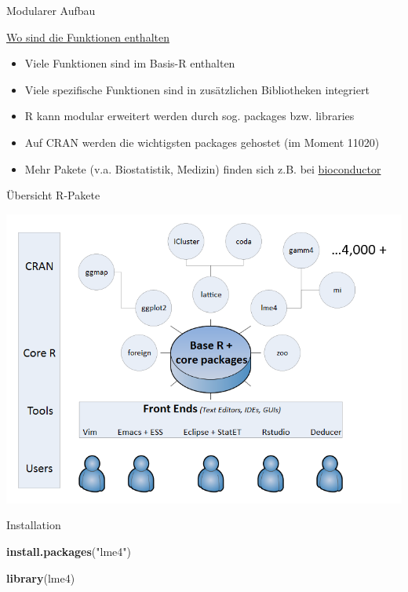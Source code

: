 \documentclass[ignorenonframetext,]{beamer}
\newenvironment{Shaded}{}{}
\newcommand{\KeywordTok}[1]{\textcolor[rgb]{0.00,0.44,0.13}{\textbf{{#1}}}}
\newcommand{\StringTok}[1]{\textcolor[rgb]{0.25,0.44,0.63}{{#1}}}
\newcommand{\NormalTok}[1]{{#1}}
\providecommand{\tightlist}{%
\setlength{\itemsep}{0pt}\setlength{\parskip}{0pt}}
\begin{document}
\begin{frame}{Modularer Aufbau}

\end{frame}

\begin{frame}{\href{https://stats.idre.ucla.edu/r/seminars/intro/}{Wo
sind die Funktionen enthalten}}

\begin{itemize}
\tightlist
\item
  Viele Funktionen sind im Basis-R enthalten
\item
  Viele spezifische Funktionen sind in zusätzlichen Bibliotheken
  integriert
\item
  R kann modular erweitert werden durch sog. packages bzw. libraries
\item
  Auf CRAN werden die wichtigsten packages gehostet (im Moment 11020)
\item
  Mehr Pakete (v.a. Biostatistik, Medizin) finden sich z.B. bei
  \href{www.bioconductor.org}{bioconductor}
\end{itemize}

\end{frame}

\begin{frame}{Übersicht R-Pakete}

\includegraphics{./tex2pdf.956/6246b503fa80f41683217b14cc9372e5ef61a781.png}

\end{frame}

\begin{frame}[fragile]{Installation}

\begin{Shaded}
\begin{Highlighting}[]
\KeywordTok{install.packages}\NormalTok{(}\StringTok{"lme4"}\NormalTok{)}

\KeywordTok{library}\NormalTok{(lme4)}
\end{Highlighting}
\end{Shaded}

\end{frame}
\end{document}
